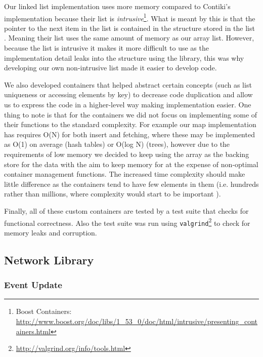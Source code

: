 Our linked list implementation uses more memory compared to Contiki's implementation because their list is \emph{intrusive}\footnote{Boost Containers: \url{http://www.boost.org/doc/libs/1\_53\_0/doc/html/intrusive/presenting\_containers.html}}. What is meant by this is that the pointer to the next item in the list is contained in the structure stored in the list \cite{?}. Meaning their list uses the same amount of memory as our array list. However, because the list is intrusive it makes it more difficult to use as the implementation detail leaks into the structure using the library, this was why developing our own non-intrusive list made it easier to develop code.

We also developed containers that helped abstract certain concepts (such as list uniqueness or accessing elements by key) to decrease code duplication and allow us to express the code in a higher-level way making implementation easier. One thing to note is that for the containers we did not focus on implementing some of their functions to the standard complexity. For example our map implementation has requires O(N) for both insert and fetching, where these may be implemented as O(1) on average (hash tables) or O(log N) (trees), however due to the requirements of low memory we decided to keep using the array as the backing store for the data with the aim to keep memory for at the expense of non-optimal container management functions. The increased time complexity should make little difference as the containers tend to have few elements in them (i.e. hundreds rather than millions, where complexity would start to be important \cite{?}).

Finally, all of these custom containers are tested by a test suite that checks for functional correctness. Also the test suite was run using \verb|valgrind|\footnote{\url{http://valgrind.org/info/tools.html}} to check for memory leaks and corruption.


\subsection{Network Library}

\subsubsection{Event Update}

